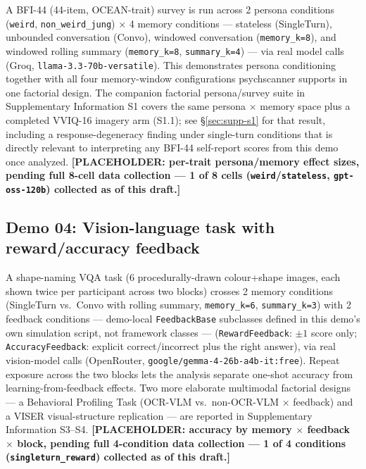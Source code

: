 \documentclass[11pt]{article}
\begin{document}
A BFI-44 (44-item, OCEAN-trait) survey is run across 2 persona conditions
(\texttt{weird}, \texttt{non\_weird\_jung}) $\times$ 4 memory conditions —
stateless (SingleTurn), unbounded conversation (Convo), windowed
conversation (\texttt{memory\_k=8}), and windowed rolling summary
(\texttt{memory\_k=8}, \texttt{summary\_k=4}) — via real model calls
(Groq, \texttt{llama-3.3-70b-versatile}). This demonstrates persona
conditioning together with all four memory-window configurations
psychscanner supports in one factorial design. The companion factorial
persona/survey suite in Supplementary Information S1 covers the same
persona $\times$ memory space plus a completed VVIQ-16 imagery arm (S1.1);
see \S\ref{sec:supp-s1} for that result, including a response-degeneracy
finding under single-turn conditions that is directly relevant to
interpreting any BFI-44 self-report scores from this demo once analyzed.
\textbf{[PLACEHOLDER: per-trait persona/memory effect sizes, pending full
8-cell data collection — 1 of 8 cells (\texttt{weird}/\texttt{stateless},
\texttt{gpt-oss-120b}) collected as of this draft.]}

\subsection{Demo 04: Vision-language task with reward/accuracy feedback}
\label{sec:demo04}

A shape-naming VQA task (6 procedurally-drawn colour+shape images, each
shown twice per participant across two blocks) crosses 2 memory conditions
(SingleTurn vs.\ Convo with rolling summary, \texttt{memory\_k=6},
\texttt{summary\_k=3}) with 2 feedback conditions — demo-local
\texttt{FeedbackBase} subclasses defined in this demo's own simulation
script, not framework classes — (\texttt{RewardFeedback}:
$\pm1$ score only; \texttt{AccuracyFeedback}: explicit correct/incorrect
plus the right answer), via real vision-model calls (OpenRouter,
\texttt{google/gemma-4-26b-a4b-it:free}). Repeat exposure across the two
blocks lets the analysis separate one-shot accuracy from
learning-from-feedback effects. Two more elaborate multimodal factorial
designs — a Behavioral Profiling Task (OCR-VLM vs.\ non-OCR-VLM
$\times$ feedback) and a VISER visual-structure replication — are reported
in Supplementary Information S3--S4. \textbf{[PLACEHOLDER: accuracy by
memory $\times$ feedback $\times$ block, pending full 4-condition data
collection — 1 of 4 conditions (\texttt{singleturn\_reward}) collected as
of this draft.]}
\end{document}
